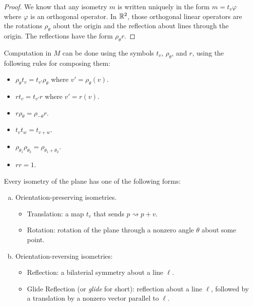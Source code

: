 \documentclass[letterpaper]{article}
\begin{document}
\begin{mdframed}
    \begin{proof}
        We know that any isometry $m$ is written uniquely in the form $m = t_v \varphi$ where $\varphi$ is an orthogonal operator. In $\mathbb{R}^2$, those orthogonal linear operators are the rotations $\rho_{\theta}$ about the origin and the reflection about lines through the origin. The reflections have the form $\rho_{\theta} r$. 
    \end{proof}
\end{mdframed}

Computation in $M$ can be done using the symbols $t_v$, $\rho_{\theta}$, and $r$, using the following rules for composing them: 
\begin{itemize}
    \item $\rho_{\theta} t_v = t_{v'} \rho_{\theta}$ where $v' = \rho_{\theta}(v)$. 
    \item $rt_v = t_{v'}r$ where $v' = r(v)$. 
    \item $r\rho_{\theta} = \rho_{-\theta} r$. 
    \item $t_v t_w = t_{v + w}$. 
    \item $\rho_{\theta_1}\rho_{\theta_2} = \rho_{\theta_1 + \theta_2}$.
    \item $rr = 1$. 
\end{itemize}

\begin{theorem}{}{}
    Every isometry of the plane has one of the following forms: 
    \begin{enumerate}[(a)]
        \item Orientation-preserving isometries. 
        \begin{itemize}
            \item Translation: a map $t_v$ that sends $p \rightsquigarrow p + v$.
            \item Rotation: rotation of the plane through a nonzero angle $\theta$ about some point.  
        \end{itemize}

        \item Orientation-reversing isometries: 
        \begin{itemize}
            \item Reflection: a bilaterial symmetry about a line $\ell$. 
            \item Glide Reflection (or \emph{glide} for short): reflection about a line $\ell$, followed by a translation by a nonzero vector parallel to $\ell$. 
        \end{itemize}
    \end{enumerate}
\end{theorem}
\end{document}

